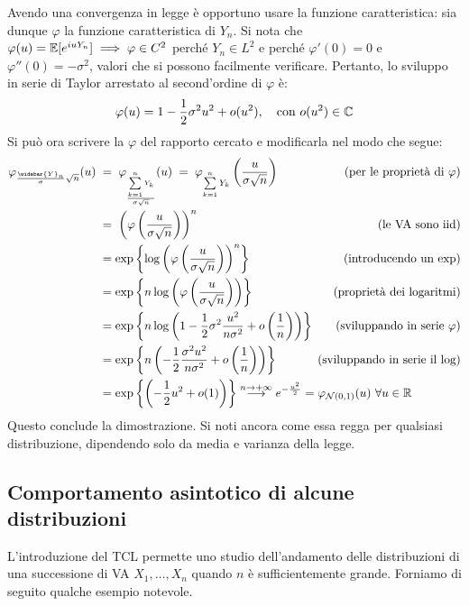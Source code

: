 \begin{dimo}
  Avendo una convergenza in legge è opportuno usare la funzione caratteristica: sia dunque $\varphi$ la funzione caratteristica di $Y_n$.
  Si nota che $\varphi(u) = \mathbb E[e^{iuY_n}] \implies \varphi \in C^2$ perché $Y_n \in L^2$ e perché $\varphi'(0) = 0$ e $\varphi''(0) = -\sigma^2$, valori che si possono facilmente verificare. Pertanto, lo sviluppo in serie di Taylor arrestato al second'ordine di $\varphi$ è:
  $$\varphi(u) = 1 - \frac{1}{2}\sigma^2 u^2 + o(u^2), \quad \text{con } o(u^2) \in \mathbb C$$
  Si può ora scrivere la $\varphi$ del rapporto cercato e modificarla nel modo che segue:
  \begin{align*}
    \varphi_{\frac{\widebar{Y}_n}{\sigma}\sqrt{n}}(u) \;
    &= \; \varphi_{\frac{\sum\limits_{k=1}^{n} Y_k}{\sigma \sqrt{n}}} (u) \;
    	= \; \varphi_{\sum\limits_{k=1}^{n} Y_k}\left( \frac{u}{\sigma \sqrt{n}} \right)
   	&\mathmakebox[1pt][r]{\hfill\text{(per le proprietà di $\varphi$)}}\\
    &= \; \left( \varphi \left( \frac{u}{\sigma \sqrt{n}} \right) \right)^n
    	&\mathmakebox[1pt][r]{\hfill\text{(le VA sono iid)}}\\
    &= \exp\left\{\log\left( \varphi \left( \frac{u}{\sigma \sqrt{n}} \right) \right)^n\right\}
	&\mathmakebox[1pt][r]{\hfill\text{(introducendo un exp)}}\\
    &= \exp\left\{n \log\left( \varphi \left( \frac{u}{\sigma \sqrt{n}} \right) \right)\right\} 
	&\mathmakebox[1pt][r]{\hfill\text{(proprietà dei logaritmi)}}\\
    &= \exp \left\{ n \log\left( 1-\frac{1}{2} \sigma^2 \frac{u^2}{n\sigma^2} + o \left( \frac{1}{n} \right) \right) \right\}
    	&\mathmakebox[1pt][r]{\hfill\text{(sviluppando in serie $\varphi$)}}\\
    &= \exp \left\{ n \left( -\frac{1}{2} \frac{\sigma^2 u^2}{n \sigma^2} + o \left( \frac{1}{n} \right) \right) \right\}
    	&\mathmakebox[1pt][r]{\hfill\text{(sviluppando in serie il log)}}\\
    &= \exp \left\{ \left( -\frac{1}{2} u^2 + o (1) \right) \right\}
    \stackrel{n \to +\infty}{\longrightarrow} e^{-\frac{u^2}{2}} = \varphi_{\Nc(0,1)}(u) \ \forall u \in \RR
	\qquad \quad %
  \end{align*}
  Questo conclude la dimostrazione.
  Si noti ancora come essa regga per qualsiasi distribuzione, dipendendo solo da media e varianza della legge.
\end{dimo}

\subsection{Comportamento asintotico di alcune distribuzioni}
L'introduzione del TCL permette uno studio dell'andamento delle distribuzioni di una successione di VA $X_1,\dots,X_n$ quando $n$ è sufficientemente grande.
Forniamo di seguito qualche esempio notevole.

